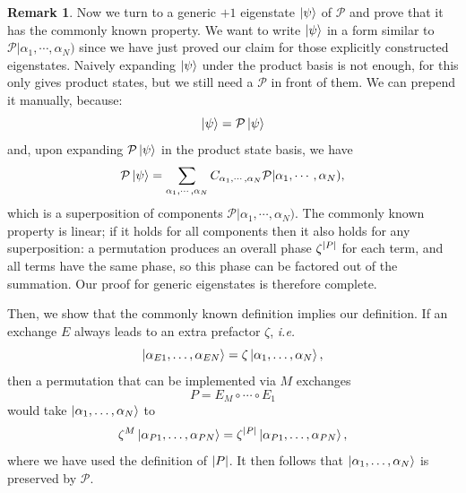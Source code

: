 \documentclass{article}
\theoremstyle{definition}
\newtheorem{rem}[mot]{Remark}
\numberwithin{equation}{section}
\begin{document}
\begin{rem}
    Now we turn to a generic $+1$ eigenstate $\ket{\psi}$ of $\mathcal{P}$
    and prove that it has the commonly known property.
    We want to write $\ket{\psi}$
    in a form similar to
    $\mathcal{P} | \alpha_{1},\cdots, \alpha_{N})$
    since we have just proved our claim for
    those explicitly constructed eigenstates.
    Naively expanding $\ket{\psi}$ under the product basis
    is not enough, for this only gives product states,
    but we still need a $\mathcal{P}$ in front of them.
    We can prepend it manually,
    because:
    \[\ket{\psi} = \mathcal{P} \ket{\psi}\]
    and, upon
    expanding $\mathcal{P} \ket{\psi}$ in the product state basis, we have
    \[
    \mathcal{P} \ket{\psi} = 
    \sum_{\alpha_{1},\cdots, \alpha_{N}}
    C_{\alpha_{1},\cdots, \alpha_{N}}
    \mathcal{P} | \alpha_{1},\cdots,\alpha_{N}),
    \]
    which is a superposition of components
    $\mathcal{P} | \alpha_{1},\cdots,\alpha_{N})$.
    The commonly known property is linear;
    if it holds for all components then it
    also holds for any superposition:
    a permutation produces an overall phase $\zeta^{\abs{P}}$
    for each term, and all terms have the same phase,
    so this phase can be factored out of the summation.
    Our proof for generic eigenstates is therefore complete.

    Then, we show that the commonly known definition 
    implies our definition. If an exchange $E$ always 
    leads to an extra prefactor $\zeta$, \textit{i.e.}
    \[
        \ket{\alpha_{E 1}, \ldots ,\alpha_{EN}}
        =
        \zeta \ket{\alpha_1, \ldots ,\alpha_{N}},
    \]
    then a permutation 
    that can be implemented via $M$ exchanges
    \[
        P = E_{M} \circ \cdots \circ E_1
    \]
    would take 
    $\ket{\alpha_{1}, \ldots ,\alpha_{N}}$ to 
    \[
        \zeta^{M} \ket{\alpha_{P 1}, \ldots ,\alpha_{PN}}
        =
        \zeta^{\abs{P}}
        \ket{\alpha_{P 1}, \ldots ,\alpha_{PN}},
    \]
    where we have used the definition of $\abs{P}$. 
    It then follows that $\ket{\alpha_1, \ldots ,\alpha_{N}}$ 
    is preserved by $\mathcal{P}$.
\end{rem}
\end{document}
